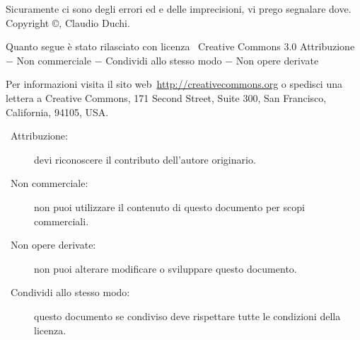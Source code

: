 Sicuramente ci sono degli errori ed e delle imprecisioni, vi  prego segnalare dove.
\vfill
Copyright \copyright\@ \the\year, Claudio Duchi.


Quanto segue è stato rilasciato con licenza \ccLogo\ Creative Commons   3.0 Attribuzione $-$ Non commerciale $-$ Condividi allo stesso modo $-$ Non opere derivate

Per informazioni visita il sito web\ \url{http://creativecommons.org} o spedisci una lettera a Creative Commons, 171 Second Street, Suite 300, San Francisco, California, 94105, USA.

\begin{description}
\item[\ccAttribution\ Attribuzione:] devi riconoscere il contributo dell'autore originario.
\item [\ccNonCommercial\ Non commerciale:] non puoi utilizzare il contenuto di questo documento per scopi commerciali.
\item [\ccNoDerivatives\ Non opere derivate:]  non puoi alterare modificare o sviluppare questo documento.
\item [\ccShareAlike\ Condividi allo stesso modo:]  questo documento se condiviso deve rispettare tutte le condizioni della licenza.
\end{description}

